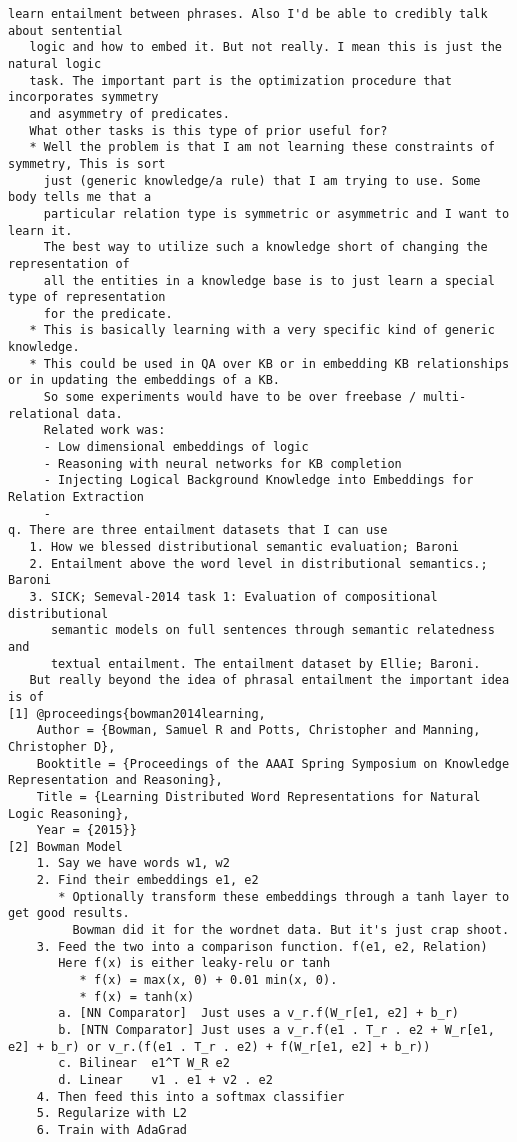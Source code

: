 \documentclass[12pt,answers]{exam} %
\begin{document}
{\begin{Verbatim}[fontsize=\small]
   learn entailment between phrases. Also I'd be able to credibly talk about sentential
   logic and how to embed it. But not really. I mean this is just the natural logic
   task. The important part is the optimization procedure that incorporates symmetry
   and asymmetry of predicates.
   What other tasks is this type of prior useful for?
   * Well the problem is that I am not learning these constraints of symmetry, This is sort
     just (generic knowledge/a rule) that I am trying to use. Some body tells me that a
     particular relation type is symmetric or asymmetric and I want to learn it.
     The best way to utilize such a knowledge short of changing the representation of
     all the entities in a knowledge base is to just learn a special type of representation
     for the predicate.
   * This is basically learning with a very specific kind of generic knowledge.
   * This could be used in QA over KB or in embedding KB relationships or in updating the embeddings of a KB.
     So some experiments would have to be over freebase / multi-relational data.
     Related work was:
     - Low dimensional embeddings of logic
     - Reasoning with neural networks for KB completion
     - Injecting Logical Background Knowledge into Embeddings for Relation Extraction
     -
q. There are three entailment datasets that I can use
   1. How we blessed distributional semantic evaluation; Baroni
   2. Entailment above the word level in distributional semantics.; Baroni
   3. SICK; Semeval-2014 task 1: Evaluation of compositional distributional
      semantic models on full sentences through semantic relatedness and
      textual entailment. The entailment dataset by Ellie; Baroni.
   But really beyond the idea of phrasal entailment the important idea is of
[1] @proceedings{bowman2014learning,
    Author = {Bowman, Samuel R and Potts, Christopher and Manning, Christopher D},
    Booktitle = {Proceedings of the AAAI Spring Symposium on Knowledge Representation and Reasoning},
    Title = {Learning Distributed Word Representations for Natural Logic Reasoning},
    Year = {2015}}
[2] Bowman Model
    1. Say we have words w1, w2
    2. Find their embeddings e1, e2
       * Optionally transform these embeddings through a tanh layer to get good results.
         Bowman did it for the wordnet data. But it's just crap shoot.
    3. Feed the two into a comparison function. f(e1, e2, Relation)
       Here f(x) is either leaky-relu or tanh
          * f(x) = max(x, 0) + 0.01 min(x, 0).
          * f(x) = tanh(x)
       a. [NN Comparator]  Just uses a v_r.f(W_r[e1, e2] + b_r)
       b. [NTN Comparator] Just uses a v_r.f(e1 . T_r . e2 + W_r[e1, e2] + b_r) or v_r.(f(e1 . T_r . e2) + f(W_r[e1, e2] + b_r))
       c. Bilinear  e1^T W_R e2
       d. Linear    v1 . e1 + v2 . e2
    4. Then feed this into a softmax classifier
    5. Regularize with L2
    6. Train with AdaGrad
\end{Verbatim}
}
\newpage
\printglossaries



\end{document}
